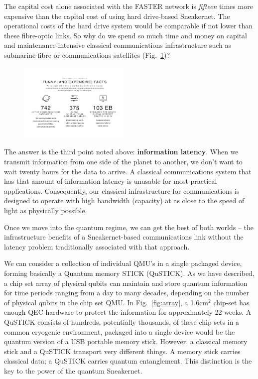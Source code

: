 \documentclass[twocolumn, aps, rmp, amsmath, amssymb, nofootinbib, superscriptaddress, longbibliography, floatfix, table-of-contents, eqsecnum]{revtex4-2}
\begin{document}
The capital cost alone associated with the FASTER network is \textit{fifteen} times more expensive than the capital cost of using hard drive-based Sneakernet. The operational costs of the hard drive system would be comparable if not lower than these fibre-optic links. So why do we spend so much time and money on capital and maintenance-intensive classical communications infrastructure such as submarine fibre or communications satellites (Fig.~\ref{fig:classical})?

\begin{figure}[htbp!]
	\includegraphics[clip=true, width=0.475\textwidth]{classical}
	\caption{} \label{fig:classical}
\end{figure}

The answer is the third point noted above: \textbf{information latency}. When we transmit information from one side of the planet to another, we don't want to wait twenty hours for the data to arrive. A classical communications system that has that amount of information latency is unusable for most practical applications. Consequently, our classical infrastructure for communications is designed to operate with high bandwidth (capacity) at as close to the speed of light as physically possible. 

Once we move into the quantum regime, we can get the best of both worlds -- the infrastructure benefits of a Sneakernet-based communications link without the latency problem traditionally associated with that approach. 

We can consider a collection of individual QMU's in a single packaged device, forming basically a Quantum memory STICK (QuSTICK). As we have described, a chip set array of physical qubits can maintain and store quantum information for time periods ranging from a day to many decades, depending on the number of physical qubits in the chip set QMU. In Fig.~\ref{fig:array}, a 1.6cm$^2$ chip-set has enough QEC hardware to protect the information for approximately 22 weeks. A QuSTICK consists of hundreds, potentially thousands, of these chip sets in a common cryogenic environment, packaged into a single device would be the quantum version of a USB portable memory stick. However, a classical memory stick and a QuSTICK transport very different things. A memory stick carries classical data; a QuSTICK carries quantum entanglement. This distinction is the key to the power of the quantum Sneakernet. 
\end{document}
